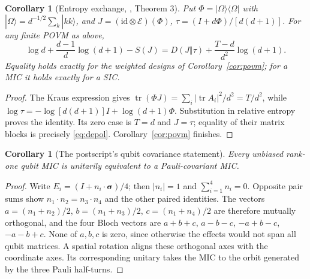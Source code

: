 \documentclass[11pt]{article}
\newtheorem{corollary}[theorem]{Corollary}
\newcommand{\tr}{\operatorname{tr}}
\newcommand{\Id}{I}
\newcommand{\cE}{\mathcal E}
\begin{document}
\begin{corollary}[Entropy exchange, \cite{DS}, Theorem 3]\label{cor:exchange}
Put $\Phi=|\Omega\rangle\langle\Omega|$ with
$|\Omega\rangle=d^{-1/2}\sum_k|kk\rangle$, and
$J=(\mathrm{id}\otimes\cE)(\Phi)$,
$\tau=(\Id+d\Phi)/[d(d+1)]$. For any finite POVM as above,
\[
 \log d+\frac{d-1}{d}\log(d+1)-S(J)
 =D(J\Vert\tau)+\frac{T-d}{d^2}\log(d+1).
\]
Equality holds exactly for the weighted designs of
Corollary~\ref{cor:povm}; for a MIC it holds exactly for a SIC.
\end{corollary}
\begin{proof}
The Kraus expression gives
$\tr(\Phi J)=\sum_i|\tr A_i|^2/d^2=T/d^2$, while
$\log\tau=-\log[d(d+1)]\Id+\log(d+1)\Phi$.
Substitution in relative entropy proves the identity.
Its zero case is $T=d$ and $J=\tau$; equality of their matrix blocks
is precisely \eqref{eq:depol}. Corollary~\ref{cor:povm} finishes.
\end{proof}

\begin{corollary}[The postscript's qubit covariance statement]\label{cor:qubit}
Every unbiased rank-one qubit MIC is unitarily equivalent to a
Pauli-covariant MIC.
\end{corollary}
\begin{proof}
Write $E_i=(\Id+n_i\cdot\boldsymbol\sigma)/4$; then $|n_i|=1$
and $\sum_{i=1}^4 n_i=0$. Opposite pair sums show
$n_1\cdot n_2=n_3\cdot n_4$ and the other paired identities.
The vectors $a=(n_1+n_2)/2$, $b=(n_1+n_3)/2$, $c=(n_1+n_4)/2$
are therefore mutually orthogonal, and the four Bloch vectors are
$a+b+c$, $a-b-c$, $-a+b-c$, $-a-b+c$.
None of $a,b,c$ is zero, since otherwise the effects would not span
all qubit matrices. A spatial rotation aligns these orthogonal axes
with the coordinate axes. Its corresponding unitary takes the MIC to
the orbit generated by the three Pauli half-turns.
\end{proof}
\end{document}

